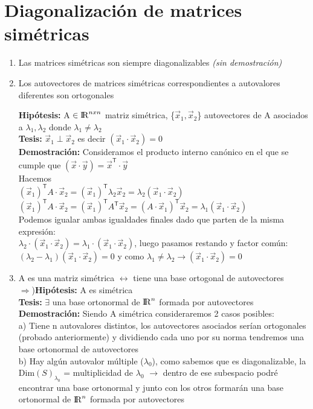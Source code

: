 \documentclass[11pt]{article}
\begin{document}
\section{Diagonalización de matrices simétricas}
\begin{enumerate}
\item Las matrices simétricas son siempre diagonalizables \textit{(sin demostración)}
\item Los autovectores de matrices simétricas correspondientes a autovalores diferentes son ortogonales 

{\bfseries {Hipótesis:}} A $\in {\rm I\!R}^{nxn}$ matriz simétrica, \{$\vec{x}_{1}, \vec{x}_2$\} autovectores de A asociados a $\lambda_{1}, \lambda_{2}$ donde $\lambda_{1} \neq \lambda_{2}$\\
{\bfseries {Tesis:}} $\vec{x}_{1} \perp \vec{x}_2$ es decir $(\vec{x}_1\cdot\vec{x}_2)=0$\\
\textbf{Demostración:} Consideramos el producto interno canónico en el que se cumple que $(\vec{x}\cdot\vec{y}) = \vec{x}^\mathsf{T}\cdot\vec{y}$\\
Hacemos \\
$(\vec{x}_1)^\mathsf{T}A\cdot\vec{x}_2=(\vec{x}_1)^\mathsf{T}\lambda_2\vec{x}_2=\lambda_2(\vec{x}_1\cdot\vec{x}_2)$\\
$(\vec{x}_1)^\mathsf{T}A \cdot \vec{x}_2=(\vec{x}_1)^\mathsf{T} A^\mathsf{T} \vec{x}_2 =(A\cdot\vec{x}_1)^\mathsf{T}\vec{x}_2=\lambda_1(\vec{x}_1\cdot\vec{x}_2)$\\
Podemos igualar ambas igualdades finales dado que parten de la misma expresión:\\
$\lambda_2\cdot(\vec{x}_1\cdot\vec{x}_2)=\lambda_1\cdot(\vec{x}_1\cdot\vec{x}_2)$, luego pasamos restando y factor común: \\
$(\lambda_2-\lambda_1)(\vec{x}_1\cdot\vec{x}_2)=0$ y como $\lambda_1 \neq \lambda_2 \rightarrow (\vec{x}_1\cdot\vec{x}_2)=0$
\\
\item A es una matriz simétrica $\leftrightarrow$ tiene una base ortogonal de autovectores\\
$\Rightarrow$){\bfseries {Hipótesis:}} A es simétrica\\ 
{\bfseries {Tesis:}} $\exists$ una base ortonormal de ${\rm I\!R}^{n}$ formada por autovectores\\
\textbf{Demostración:} Siendo A simétrica consideraremos 2 casos posibles:\\
a) Tiene n autovalores distintos, los autovectores asociados serían ortogonales (probado anteriormente) y dividiendo cada uno por su norma tendremos una base ortonormal de autovectores \\
b) Hay algún autovalor múltiple ($\lambda_0$), como sabemos que es diagonalizable, la Dim$(S)_{\lambda_{0}}$ = multiplicidad de $\lambda_0$ $\rightarrow$ dentro de ese subespacio podré encontrar una base ortonormal y junto con los otros formarán una base ortonormal de ${\rm I\!R}^{n}$ formada por autovectores


\end{enumerate}
\end{document}
